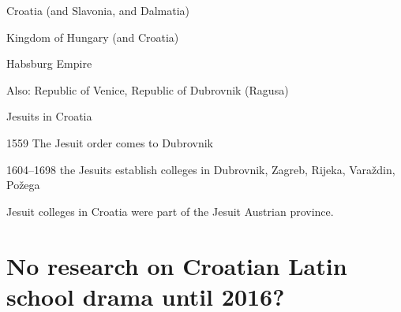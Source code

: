 \documentclass[14pt]{beamer}
\begin{document}
\begin{frame}

Croatia (and Slavonia, and Dalmatia)

Kingdom of Hungary (and Croatia)

Habsburg Empire

Also: Republic of Venice, Republic of Dubrovnik (Ragusa)

\end{frame}


\begin{frame}{Jesuits in Croatia}

\alert{1559} The Jesuit order comes to Dubrovnik

\alert{1604–1698} the Jesuits establish colleges in Dubrovnik, Zagreb, Rijeka, Varaždin, Požega

Jesuit colleges in Croatia were part of the Jesuit Austrian province.

\end{frame}

{
    \begin{frame}[plain]
    \end{frame}
    }



\section{No research on Croatian Latin school drama until 2016?}
\end{document}
